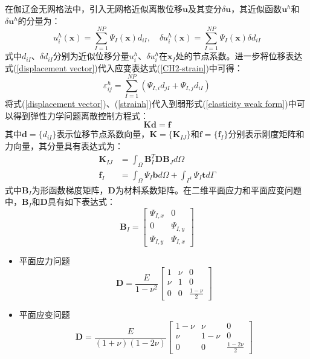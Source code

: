 在伽辽金无网格法中，引入无网格近似离散位移$\pmb u$及其变分$\delta \pmb u$，其近似函数$\pmb u^h$和$\delta \pmb u^h$的分量为：
\begin{equation}\label{displacement vector}
    u^h_{i}(\pmb x) = \sum_{I=1}^{N\!P}\Psi_I(\pmb x) d_{iI}, \quad \delta u^h_{i}(\pmb x) = \sum_{I=1}^{N\!P}\Psi_I(\pmb x) \delta d_{iI}
\end{equation}
式中$d_{iI}$、$\delta d_{iI}$分别为近似位移分量$u^h_i$、$\delta u^h_i$在$\pmb x_I$处的节点系数。进一步将位移表达式(\ref{displacement vector})代入应变表达式(\ref{CH2-strain})中可得：
\begin{equation}\label{strainh}
\varepsilon^h_{ij} = \sum_{I=1}^{N\!P} (\Psi_{I,i}d_{jI}+\Psi_{I,j}d_{iI})
\end{equation}
将式(\ref{displacement vector})、(\ref{strainh})代入到弱形式(\ref{elasticity weak form})中可以得到弹性力学问题离散控制方程式：
\begin{equation}
    \pmb{K}\pmb{d}=\pmb{f}
\end{equation}
其中$\pmb{d}=\{d_{iI}\}$表示位移节点系数向量，$\pmb{K}=\{\pmb K_{IJ}\}$和$\pmb{f}=\{\pmb f_I\}$分别表示刚度矩阵和力向量，其分量具有表达式为：
\begin{subequations}\label{EKf}
\begin{align}
        \pmb K_{IJ}&=\int_{\Omega}\pmb{B}_I^T\pmb{D}\pmb{B}_Jd\Omega\label{EKf1}\\
        \pmb f_I&=\int_{\Omega}\Psi_I\pmb{b}d\Omega+\int_{\Gamma^t}\Psi_I\pmb{t}d\Gamma\label{EKf2}
\end{align}
\end{subequations}
式中$\pmb B_I$为形函数梯度矩阵，$\pmb D$为材料系数矩阵。在二维平面应力和平面应变问题中，$\pmb B_I$和$\pmb D$具有如下表达式：
\begin{equation}\label{strain vector}
    \pmb{B}_I= \left[\begin{matrix}\Psi_{I,x}&0\\0&\Psi_{I,y}\\\Psi_{I,y}&\Psi_{I,x} \end{matrix}\right] 
\end{equation}
\begin{itemize}
    \item 平面应力问题
\begin{equation}\label{Dplanestress}
\pmb D = \frac{E}{1-\nu^2}\left[\begin{matrix}1&\nu&0\\\nu&1&0\\0&0&\frac{1-\nu}{2}
\end{matrix}\right] 
\end{equation}
\item 平面应变问题
\begin{equation}
\pmb D = \frac{E}{(1+\nu)(1-2\nu)}\left[\begin{matrix}1-\nu&\nu&0\\\nu&1-\nu&0\\0&0&\frac{1-2\nu}{2}
\end{matrix}\right] 
\end{equation}
\end{itemize}

